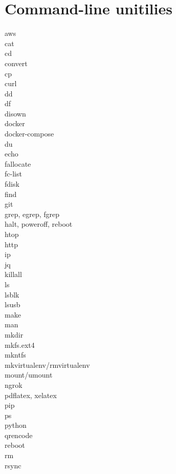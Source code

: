 \documentclass [8pt] {extarticle}
\begin{document}
    \section {Command-line unitilies}

    aws \\
    cat \\
    cd \\
    convert \\
    cp \\
    curl \\
    dd \\
    df \\
    disown  \\
    docker \\
    docker-compose \\
    du \\
    echo \\
    fallocate \\
    fc-list \\
    fdisk \\
    find \\
    git \\
    grep, egrep, fgrep \\
    halt, poweroff, reboot \\
    htop \\
    http \\
    ip \\
    jq \\
    killall \\
    ls \\
    lsblk \\
    lsusb \\
    make \\
    man \\
    mkdir \\
    mkfs.ext4 \\
    mkntfs \\
    mkvirtualenv/rmvirtualenv \\
    mount/umount \\
    ngrok \\
    pdflatex, xelatex \\
    pip \\
    ps \\
    python \\
    qrencode \\
    reboot \\
    rm \\
    rsync \\
\end{document}

